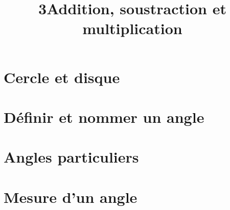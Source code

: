 \documentclass[12pt,a4paper]{article}
\date{}
\title{\textcircled{{\normalsize{3}}}Addition, soustraction et multiplication }
\begin{document}
	
	\maketitle



\section{Cercle et disque }



\section{Définir et nommer un angle}



\section{Angles particuliers}



\section{Mesure d'un angle}


\end{document}
